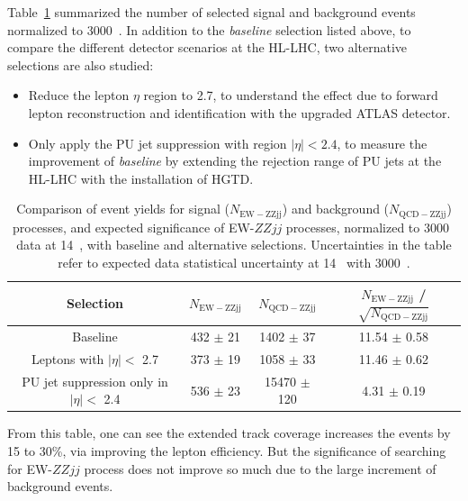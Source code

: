 Table~\ref{tab:event_yield} summarized the number of selected signal and background events normalized to 3000~\ifb.
In addition to the \textit{baseline} selection listed above, to compare the different detector scenarios at the HL-LHC, two alternative selections are also studied:
\begin{itemize}
	\item Reduce the lepton $\eta$ region to 2.7, to understand the effect due to forward lepton reconstruction and identification with the upgraded ATLAS detector.
	\item Only apply the PU jet suppression with region $|\eta| < 2.4$, to measure the improvement of \textit{baseline} by extending the rejection range of PU jets at the HL-LHC with the installation of HGTD.
\end{itemize}
\begin{table}[htbp]
  \small
  \centering
  \begin{tabular}{|c|c|c|c|}
    \hline
    Selection & $N_{\mathrm{EW-ZZjj}}$ & $N_{\mathrm{QCD-ZZjj}}$ & $N_{\mathrm{EW-ZZjj}}$ / $\sqrt{N_{\mathrm{QCD-ZZjj}}}$ \\
    \hline
    Baseline                                 & 432 $\pm$ 21 & 1402 $\pm$ 37   & 11.54 $\pm$ 0.58 \\
    \hline
    Leptons with $|\eta|<$ 2.7               & 373 $\pm$ 19 & 1058 $\pm$ 33   & 11.46 $\pm$ 0.62 \\
    \hline
    PU jet suppression only in $|\eta|<$ 2.4 & 536 $\pm$ 23 & 15470 $\pm$ 120 &  4.31 $\pm$ 0.19  \\
    \hline
  \end{tabular}
  \caption{
    Comparison of event yields for signal ($N_{\mathrm{EW-ZZjj}}$) and background ($N_{\mathrm{QCD-ZZjj}}$) processes, 
    and expected significance of EW-$ZZjj$ processes,
    normalized to 3000~\ifb{} data at 14~\TeV{},
    with baseline and alternative selections.
    Uncertainties in the table refer to expected data statistical uncertainty at 14~\TeV{} with 3000~\ifb{}.
  }
  \label{tab:event_yield}
\end{table}
From this table, one can see the extended track coverage increases the \lllljj events by 15 to 30\%, via improving the lepton efficiency.
But the significance of searching for EW-$ZZjj$ process does not improve so much due to the large increment of background events.

